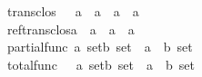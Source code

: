 \begin{isabellebody}
\isanewline
trans{\isacharunderscore}clos\ \ \ {\isacharcolon}{\isacharcolon}{\isachardoublequoteopen}{\isacharparenleft}{\isacharprime}a\ {\isacharless}{\isacharequal}{\isachargreater}\ {\isacharprime}a{\isacharparenright}\ {\isacharequal}{\isachargreater}\ {\isacharparenleft}{\isacharprime}a\ {\isacharless}{\isacharequal}{\isachargreater}\ {\isacharprime}a{\isacharparenright}\ {\isachardoublequoteclose}\ \ \ \ \ \ \ \ \ \ \ \ {\isacharparenleft}{\isachardoublequoteopen}{\isacharunderscore}\ {\isasymplus}\ {\isachardoublequoteclose}\ \ \ {\isacharbrackleft}{}{}{}{}{\isacharbrackright}\ {}{}{}{\isacharparenright}\isanewline
ref{\isacharunderscore}trans{\isacharunderscore}clos{\isacharcolon}{\isacharcolon}{\isachardoublequoteopen}{\isacharparenleft}{\isacharprime}a\ {\isacharless}{\isacharequal}{\isachargreater}\ {\isacharprime}a{\isacharparenright}\ {\isacharequal}{\isachargreater}\ {\isacharparenleft}{\isacharprime}a\ {\isacharless}{\isacharequal}{\isachargreater}\ {\isacharprime}a{\isacharparenright}\ {\isachardoublequoteclose}\ \ \ \ \ \ \ \ \ \ \ {\isacharparenleft}{\isachardoublequoteopen}{\isacharunderscore}\ {\isasymstar}{\isachardoublequoteclose}\ \ \ \ {\isacharbrackleft}{}{}{}{}{\isacharbrackright}\ {}{}{}{\isacharparenright}\isanewline
\isanewline
partial{\isacharunderscore}func\ {\isacharcolon}{\isacharcolon}{\isachardoublequoteopen}{\isacharbrackleft}{\isacharprime}a\ set{\isacharcomma}{\isacharprime}b\ set{\isacharbrackright}\ {\isacharequal}{\isachargreater}\ {\isacharparenleft}{\isacharprime}a\ {\isacharless}{\isacharequal}{\isachargreater}\ {\isacharprime}b{\isacharparenright}\ set{\isachardoublequoteclose}\ \ \ \ \ {\isacharparenleft}{\isachardoublequoteopen}{\isacharunderscore}\ {\isasympfun}\ {\isacharunderscore}{\isachardoublequoteclose}\ \ {\isacharbrackleft}{}{}{\isacharcomma}{}{}{\isacharbrackright}\ {}{}{\isacharparenright}\isanewline
total{\isacharunderscore}func\ \ \ {\isacharcolon}{\isacharcolon}{\isachardoublequoteopen}{\isacharbrackleft}{\isacharprime}a\ set{\isacharcomma}{\isacharprime}b\ set{\isacharbrackright}\ {\isacharequal}{\isachargreater}\ {\isacharparenleft}{\isacharprime}a\ {\isacharless}{\isacharequal}{\isachargreater}\ {\isacharprime}b{\isacharparenright}\ set{\isachardoublequoteclose}\ \ \ \ \ {\isacharparenleft}{\isachardoublequoteopen}{\isacharunderscore}\ {\isasymfun}\ {\isacharunderscore}{\isachardoublequoteclose}\ \ \ {\isacharbrackleft}{}{}{\isacharcomma}{}{}{\isacharbrackright}\ {}{}{\isacharparenright}\isanewline

\end{isabellebody}
